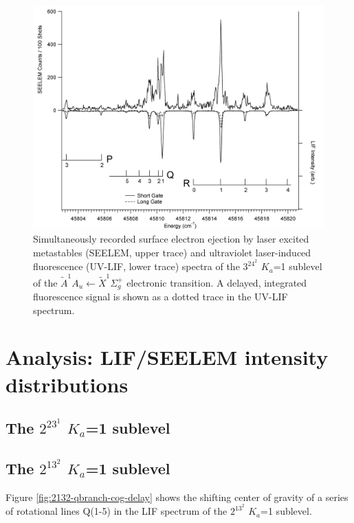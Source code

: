 \documentclass[12pt]{mitthesis}
\begin{document}
\begin{figure}
  \caption{
    Simultaneously recorded surface electron ejection by laser excited
    metastables (SEELEM, upper trace) and ultraviolet laser-induced
    fluorescence (UV-LIF, lower trace) spectra of the $3^24^2$ $K_a$=1
    sublevel of the $\tilde{A}^1A_u \leftarrow \tilde{X} ^1\Sigma_g^+$
    electronic transition. A delayed, integrated fluorescence signal
    is shown as a dotted trace in the UV-LIF spectrum.}
  \label{fig:spectrum-32b2}
  \centering
  \includegraphics[width=7.5in,angle=90]{spectrum-32b2.png}
\end{figure}

\section{Analysis: LIF/SEELEM intensity distributions}

\subsection{The $2^23^1$ $K_a$=1 sublevel}

\subsection{The $2^13^2$ $K_a$=1 sublevel}

Figure \ref{fig:2132-qbranch-cog-delay} shows the shifting center of
gravity of a series of rotational lines Q(1-5) in the LIF spectrum of
the $2^13^2$ $K_a$=1 sublevel.
\end{document}
